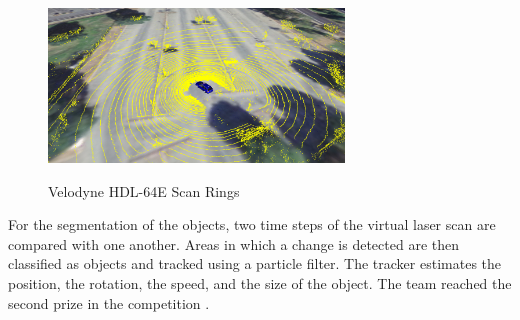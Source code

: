 \documentclass[11pt,oneside,openright]{mpreport}
\begin{document}
\begin{figure}[!ht]
\begin{center}
\caption{Velodyne HDL-64E Scan Rings \cite{Montemerlo2009}}
\includegraphics[width=0.7\textwidth]{bilder/stanford_junior_velodyne.png}
\label{stanford_junior_velodyne}
\end{center}
\end{figure}


For the segmentation of the objects, two time steps of the virtual laser scan are compared with one another. Areas in which a change is detected are then classified 
as objects and tracked using a particle filter. The tracker estimates the position, the rotation, the speed, and the size of the object.
The team reached the second prize in the competition \cite{Release2007}.
\end{document}
